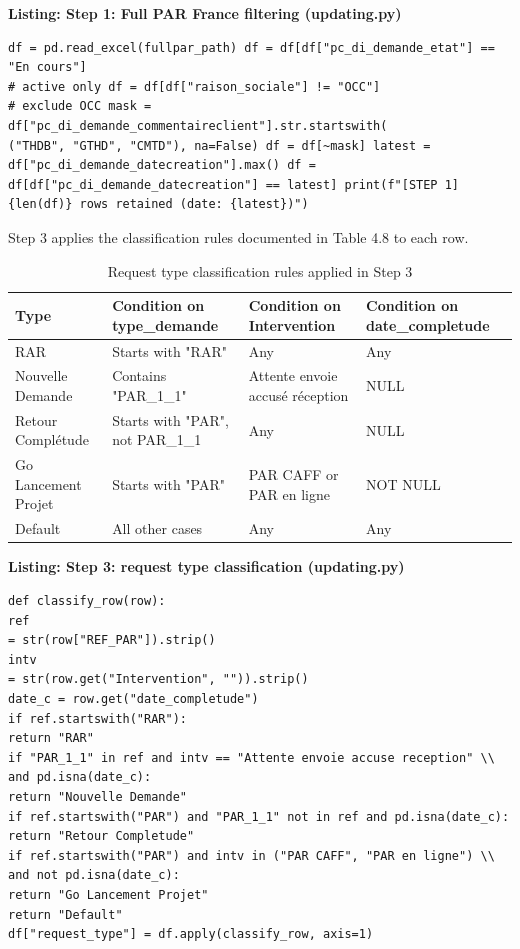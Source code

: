 \begin{center}\small\textbf{Listing: Step 1: Full PAR France filtering (updating.py)}\end{center}
\begin{Verbatim}[breaklines=true,fontsize=\footnotesize,frame=single]
df = pd.read_excel(fullpar_path) df = df[df["pc_di_demande_etat"] == "En cours"]
# active only df = df[df["raison_sociale"] != "OCC"]
# exclude OCC mask = df["pc_di_demande_commentaireclient"].str.startswith(
("THDB", "GTHD", "CMTD"), na=False) df = df[~mask] latest = df["pc_di_demande_datecreation"].max() df = df[df["pc_di_demande_datecreation"] == latest] print(f"[STEP 1] {len(df)} rows retained (date: {latest})")
\end{Verbatim}

Step 3 applies the classification rules documented in Table 4.8 to each row.

\begin{table}[H]
  \centering
  \caption{Request type classification rules applied in Step 3}
  \renewcommand{\arraystretch}{1.0}
  \footnotesize
  \begin{tabularx}{\textwidth}{|X|X|X|X|}
    \hline
    \textbf{Type} & \textbf{Condition on type\_demande} & \textbf{Condition on Intervention} & \textbf{Condition on date\_completude} \\ \hline
    RAR & Starts with "RAR" & Any & Any \\ \hline
    Nouvelle Demande & Contains "PAR\_1\_1" & Attente envoie accusé réception & NULL \\ \hline
    Retour Complétude & Starts with "PAR", not PAR\_1\_1 & Any & NULL \\ \hline
    Go Lancement Projet & Starts with "PAR" & PAR CAFF or PAR en ligne & NOT NULL \\ \hline
    Default & All other cases & Any & Any \\ \hline
  \end{tabularx}
\end{table}

\begin{center}\small\textbf{Listing: Step 3: request type classification (updating.py)}\end{center}
\begin{Verbatim}[breaklines=true,fontsize=\footnotesize,frame=single]
def classify_row(row):
ref
= str(row["REF_PAR"]).strip()
intv
= str(row.get("Intervention", "")).strip()
date_c = row.get("date_completude")
if ref.startswith("RAR"):
return "RAR"
if "PAR_1_1" in ref and intv == "Attente envoie accuse reception" \\
and pd.isna(date_c):
return "Nouvelle Demande"
if ref.startswith("PAR") and "PAR_1_1" not in ref and pd.isna(date_c):
return "Retour Completude"
if ref.startswith("PAR") and intv in ("PAR CAFF", "PAR en ligne") \\
and not pd.isna(date_c):
return "Go Lancement Projet"
return "Default"
df["request_type"] = df.apply(classify_row, axis=1)
\end{Verbatim}

